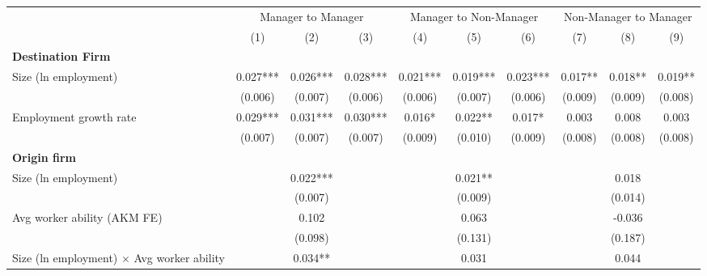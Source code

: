 {
\def\sym#1{\ifmmode^{#1}\else\(^{#1}\)\fi}
\begin{tabular}{l*{9}{c}}
                &\multicolumn{3}{c}{Manager to Manager}&\multicolumn{3}{c}{Manager to Non-Manager}&\multicolumn{3}{c}{Non-Manager to Manager}\\\cmidrule(lr){2-4}\cmidrule(lr){5-7}\cmidrule(lr){8-10}
                &\multicolumn{1}{c}{(1)}   &\multicolumn{1}{c}{(2)}   &\multicolumn{1}{c}{(3)}   &\multicolumn{1}{c}{(4)}   &\multicolumn{1}{c}{(5)}   &\multicolumn{1}{c}{(6)}   &\multicolumn{1}{c}{(7)}   &\multicolumn{1}{c}{(8)}   &\multicolumn{1}{c}{(9)}   \\
\midrule \textbf{Destination Firm}&            &            &            &            &            &            &            &            &            \\
Size (ln employment)&    0.027***&    0.026***&    0.028***&    0.021***&    0.019***&    0.023***&    0.017** &    0.018** &    0.019** \\
                &  (0.006)   &  (0.007)   &  (0.006)   &  (0.006)   &  (0.007)   &  (0.006)   &  (0.009)   &  (0.009)   &  (0.008)   \\
Employment growth rate&    0.029***&    0.031***&    0.030***&    0.016*  &    0.022** &    0.017*  &    0.003   &    0.008   &    0.003   \\
                &  (0.007)   &  (0.007)   &  (0.007)   &  (0.009)   &  (0.010)   &  (0.009)   &  (0.008)   &  (0.008)   &  (0.008)   \\
\textbf{Origin firm}&            &            &            &            &            &            &            &            &            \\
Size (ln employment)&            &    0.022***&            &            &    0.021** &            &            &    0.018   &            \\
                &            &  (0.007)   &            &            &  (0.009)   &            &            &  (0.014)   &            \\
Avg worker ability (AKM FE)&            &    0.102   &            &            &    0.063   &            &            &   -0.036   &            \\
                &            &  (0.098)   &            &            &  (0.131)   &            &            &  (0.187)   &            \\
Size (ln employment) $\times$ Avg worker ability&            &    0.034** &            &            &    0.031   &            &            &    0.044   &            \\

\end{tabular}}
